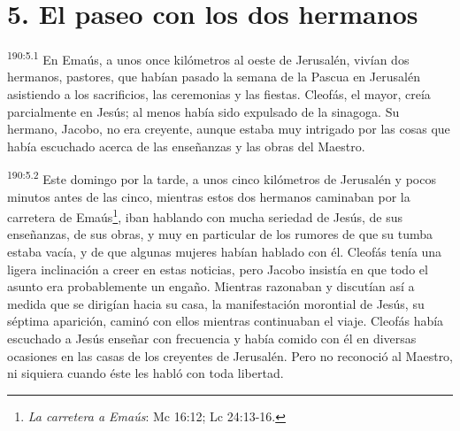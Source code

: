 \section*{5. El paseo con los dos hermanos}
\par
\textsuperscript{190:5.1} En Emaús, a unos once kilómetros al oeste de Jerusalén, vivían dos hermanos, pastores, que habían pasado la semana de la Pascua en Jerusalén asistiendo a los sacrificios, las ceremonias y las fiestas. Cleofás, el mayor, creía parcialmente en Jesús; al menos había sido expulsado de la sinagoga. Su hermano, Jacobo, no era creyente, aunque estaba muy intrigado por las cosas que había escuchado acerca de las enseñanzas y las obras del Maestro.

\par
\textsuperscript{190:5.2} Este domingo por la tarde, a unos cinco kilómetros de Jerusalén y pocos minutos antes de las cinco, mientras estos dos hermanos caminaban por la carretera de Emaús\footnote{\textit{La carretera a Emaús}: Mc 16:12; Lc 24:13-16.}, iban hablando con mucha seriedad de Jesús, de sus enseñanzas, de sus obras, y muy en particular de los rumores de que su tumba estaba vacía, y de que algunas mujeres habían hablado con él. Cleofás tenía una ligera inclinación a creer en estas noticias, pero Jacobo insistía en que todo el asunto era probablemente un engaño. Mientras razonaban y discutían así a medida que se dirigían hacia su casa, la manifestación morontial de Jesús, su séptima aparición, caminó con ellos mientras continuaban el viaje. Cleofás había escuchado a Jesús enseñar con frecuencia y había comido con él en diversas ocasiones en las casas de los creyentes de Jerusalén. Pero no reconoció al Maestro, ni siquiera cuando éste les habló con toda libertad.

